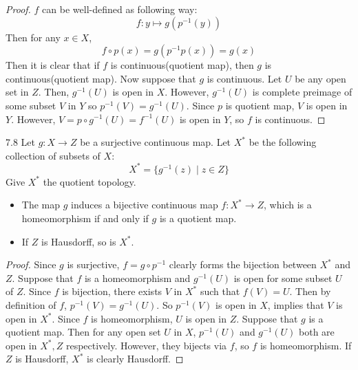 \documentclass[12pt, a4paper, twoside]{article}
\theoremstyle{plain}
\begin{document}
\begin{proof}
    $f$ can be well-defined as following way: 
    \[f: y \mapsto g\left( p^{-1}(y) \right)\]
    Then for any $x \in X$, 
    \[f \circ p (x) = g(p^{-1}p(x)) = g(x)\]
    Then it is clear that if $f$ is continuous(quotient map), then $g$ is continuous(quotient map). 
    Now suppose that $g$ is continuous. Let $U$ be any open set in $Z$. 
    Then, $g^{-1}(U)$ is open in $X$. However, $g^{-1}(U)$ is complete preimage of some subset $V$ in $Y$ so $p^{-1}(V) = g^{-1}(U)$. 
    Since $p$ is quotient map, $V$ is open in $Y$. However, $V = p \circ g^{-1}(U) = f^{-1}(U)$ is open in $Y$, so $f$ is continuous.  
\end{proof}

\begin{cor}{}{7.8}
    Let $g: X \rightarrow Z$ be a surjective continuous map. Let $X^*$ be the following 
    collection of subsets of $X$: 
    \[X^* = \{g^{-1}(z) \mid z \in Z\}\]
    Give $X^*$ the quotient topology. 
    \begin{itemize}
        \item The map $g$ induces a bijective continuous map $f: X^* \rightarrow Z$, which is a homeomorphism if and only if $g$ is a quotient map. 
        \begin{center}
        \end{center}
        \item If $Z$ is Hausdorff, so is $X^*$.  
    \end{itemize}
\end{cor}

\begin{proof}
    Since $g$ is surjective, $f = g \circ p^{-1}$ clearly forms the bijection between $X^*$ and $Z$. 
    Suppose that $f$ is a homeomorphism and $g^{-1}(U)$ is open for some subset $U$ of $Z$. 
    Since $f$ is bijection, there exists $V$ in $X^*$ such that $f(V) = U$. 
    Then by definition of $f$, $p^{-1}(V) = g^{-1}(U)$. So $p^{-1}(V)$ is open in $X$, implies that $V$ is open in $X^*$. 
    Since $f$ is homeomorphism, $U$ is open in $Z$. 
    Suppose that $g$ is a quotient map. Then for any open set $U$ in $X$, 
    $p^{-1}(U)$ and $g^{-1}(U)$ both are open in $X^*, Z$ respectively. 
    However, they bijects via $f$, so $f$ is homeomorphism. 
    If $Z$ is Hausdorff, $X^*$ is clearly Hausdorff. 
\end{proof}
\end{document}
